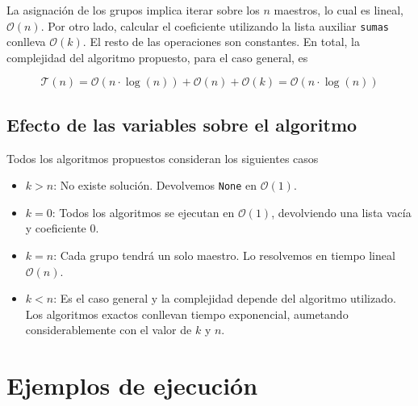 \documentclass{article}
\begin{document}
La asignación de los grupos implica iterar sobre los $n$ maestros, lo cual es lineal, $\mathcal{O}(n)$. Por otro lado, calcular el coeficiente utilizando la lista auxiliar \texttt{sumas} conlleva $\mathcal{O}(k)$. El resto de las operaciones son constantes. En total, la complejidad del algoritmo propuesto, para el caso general, es

$$
\mathcal{T}(n) = \mathcal{O}(n \cdot \log (n)) + \mathcal{O}(n) + \mathcal{O}(k) = \mathcal{O}(n \cdot \log (n))
$$

\subsection{Efecto de las variables sobre el algoritmo}
Todos los algoritmos propuestos consideran los siguientes casos
\begin{itemize}
    \item $k > n$: No existe solución. Devolvemos \texttt{None} en $\mathcal{O}(1)$.
    \item $k = 0$: Todos los algoritmos se ejecutan en $\mathcal{O}(1)$, devolviendo una lista vacía y coeficiente 0. 
    \item $k = n$: Cada grupo tendrá un solo maestro. Lo resolvemos en tiempo lineal $\mathcal{O}(n)$.
    \item $k < n$: Es el caso general y la complejidad depende del algoritmo utilizado. Los algoritmos exactos conllevan tiempo exponencial, aumetando considerablemente con el valor de $k$ y $n$.
\end{itemize}

\section{Ejemplos de ejecución}
\label{sec:ejemplos}
\end{document}

